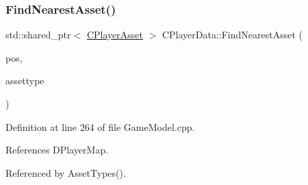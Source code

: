 \hypertarget{classCPlayerData_a5f70ad16e9b4e8aa9edc6e8fc4136527}{}\label{classCPlayerData_a5f70ad16e9b4e8aa9edc6e8fc4136527} 
\subsubsection{\texorpdfstring{Find\+Nearest\+Asset()}{FindNearestAsset()}}
{\footnotesize\ttfamily std\+::shared\+\_\+ptr$<$ \hyperlink{classCPlayerAsset}{C\+Player\+Asset} $>$ C\+Player\+Data\+::\+Find\+Nearest\+Asset (\begin{DoxyParamCaption}\item[{const \hyperlink{classCPosition}{C\+Position} \&}]{pos,  }\item[{\hyperlink{GameDataTypes_8h_a5600d4fc433b83300308921974477fec}{E\+Asset\+Type}}]{assettype }\end{DoxyParamCaption})}



Definition at line 264 of file Game\+Model.\+cpp.



References D\+Player\+Map.



Referenced by Asset\+Types().


